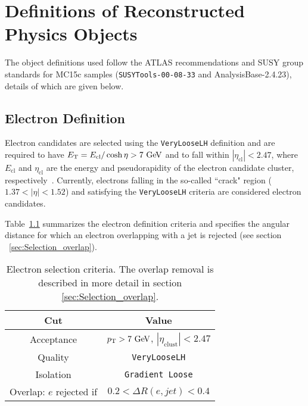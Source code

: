 \chapter{Definitions of Reconstructed Physics Objects}
\label{chap:objects}

The object definitions used follow the ATLAS recommendations and SUSY group standards for MC15c samples ({\tt SUSYTools-00-08-33} and AnalysisBase-2.4.23), details of which are given below. %

\section{Electron Definition}  \label{sec:EleDef}

Electron candidates are selected using the {\tt VeryLooseLH} definition and are required to have $\et = E_{\mathrm{cl}} / \cosh{\eta} > 7 \gev$ and to fall within $|\eta_{\mathrm{cl}}| < 2.47$, where $E_{\mathrm{cl}}$ and $\eta_{\mathrm{cl}}$ are the energy and pseudorapidity of the electron candidate cluster, respectively~\cite{EgammaRun2Analyseswiki}. Currently, electrons falling in the so-called ``crack" region ($1.37 < |\eta| < 1.52$) and satisfying the {\tt VeryLooseLH} criteria are considered electron candidates.


Table~\ref{tb:electrons} summarizes the electron definition criteria and specifies the angular distance for which an electron overlapping with a jet is rejected (see section ~\ref{sec:Selection_overlap}).   


\begin{table}[htp]
  \caption{Electron selection criteria. The overlap removal is described in more detail in section \ref{sec:Selection_overlap}.}
  \begin{center}
    \begin{tabular}{c|c} \hline \hline
      Cut & Value \\ \hline \hline
      Acceptance & $\pT > 7 \gev$, $|\eta_{\mathrm{clust}}| < 2.47$ \\ \hline
      Quality & {\tt VeryLooseLH} \\ \hline
      Isolation & {\tt Gradient Loose} \\ \hline
      Overlap: $e$ rejected if &  $0.2 < \Delta R(e,jet) < 0.4$\\ \hline%
      \hline
    \end{tabular}
  \end{center}
  \label{tb:electrons}
\end{table}%


